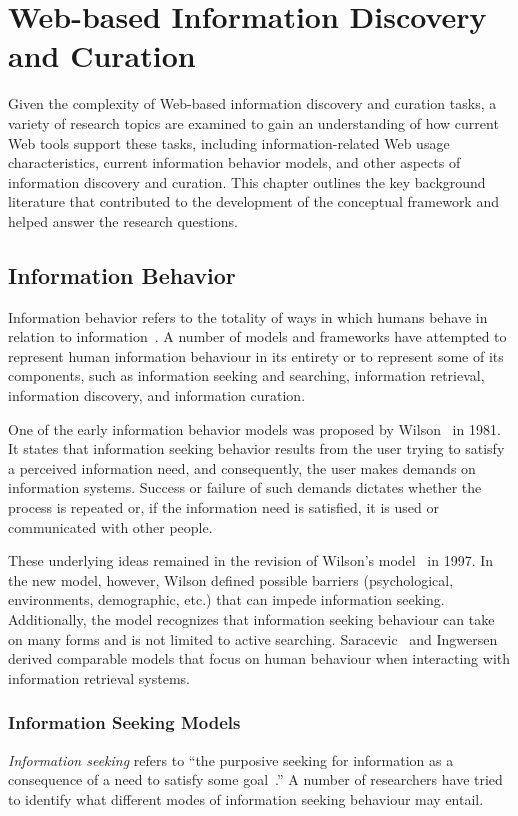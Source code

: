 \chapter{Web-based Information Discovery and Curation}
\label{chapter:chapter_related_work}

Given the complexity of Web-based information discovery and curation tasks, a variety of research topics are examined to gain an understanding of how current Web tools support these tasks, including information-related Web usage characteristics, current information behavior models, and other aspects of information discovery and curation.  This chapter outlines the key background literature that contributed to the development of the conceptual framework and helped answer the research questions. 

{\section{Information Behavior}
Information behavior refers to the totality of ways in which humans behave in relation to information~\cite{wilson2000human}.  A number of models and frameworks have attempted to represent human information behaviour in its entirety or to represent some of its components, such as information seeking and searching, information retrieval, information discovery, and information curation. 

One of the early information behavior models was proposed by Wilson~\cite{wilson1981user} in 1981. It states that information seeking behavior results from the user trying to satisfy a perceived information need, and consequently, the user makes demands on information systems. Success or failure of such demands dictates whether the process is repeated or, if the information need is satisfied, it is used or communicated with other people. 
\pagebreak

These underlying ideas remained in the revision of Wilson's model~\cite{wilson1997information} in 1997. In the new model, however, Wilson defined possible barriers (psychological, environments, demographic, etc.) that can impede information seeking. Additionally, the model recognizes that information seeking behaviour can take on many forms and is not limited to active searching. Saracevic~\cite{saracevic1996modeling} and Ingwersen~\cite{ingwersen1996cognitive} derived comparable models that focus on human behaviour when interacting with information retrieval systems. 

{\subsection{Information Seeking Models}
\textit{Information seeking} refers to ``the purposive seeking for information as a consequence of a need to satisfy some goal~\cite{wilson2000human}.'' A number of researchers have tried to identify what different modes of information seeking behaviour may entail. 

}}
